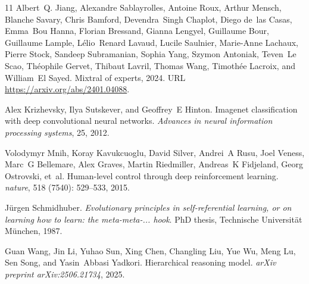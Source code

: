 \begin{thebibliography}{11}
Albert~Q. Jiang, Alexandre Sablayrolles, Antoine Roux, Arthur Mensch, Blanche Savary, Chris Bamford, Devendra~Singh Chaplot, Diego de~las Casas, Emma~Bou Hanna, Florian Bressand, Gianna Lengyel, Guillaume Bour, Guillaume Lample, Lélio~Renard Lavaud, Lucile Saulnier, Marie-Anne Lachaux, Pierre Stock, Sandeep Subramanian, Sophia Yang, Szymon Antoniak, Teven~Le Scao, Théophile Gervet, Thibaut Lavril, Thomas Wang, Timothée Lacroix, and William~El Sayed.
\newblock Mixtral of experts, 2024.
\newblock URL \url{https://arxiv.org/abs/2401.04088}.

Alex Krizhevsky, Ilya Sutskever, and Geoffrey~E Hinton.
\newblock Imagenet classification with deep convolutional neural networks.
\newblock \emph{Advances in neural information processing systems}, 25, 2012.

Volodymyr Mnih, Koray Kavukcuoglu, David Silver, Andrei~A Rusu, Joel Veness, Marc~G Bellemare, Alex Graves, Martin Riedmiller, Andreas~K Fidjeland, Georg Ostrovski, et~al.
\newblock Human-level control through deep reinforcement learning.
\newblock \emph{nature}, 518 (7540): 529--533, 2015.

J{\"u}rgen Schmidhuber.
\newblock \emph{Evolutionary principles in self-referential learning, or on learning how to learn: the meta-meta-... hook}.
\newblock PhD thesis, Technische Universit{\"a}t M{\"u}nchen, 1987.

Guan Wang, Jin Li, Yuhao Sun, Xing Chen, Changling Liu, Yue Wu, Meng Lu, Sen Song, and Yasin~Abbasi Yadkori.
\newblock Hierarchical reasoning model.
\newblock \emph{arXiv preprint arXiv:2506.21734}, 2025.

\end{thebibliography}
